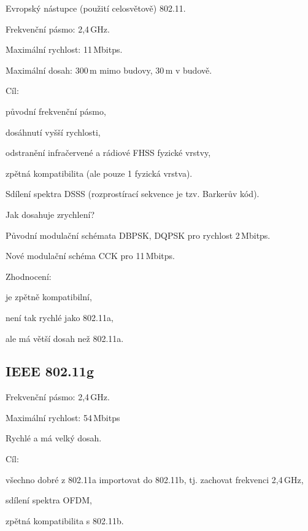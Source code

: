 \begin{compactitem}
    \item Evropský nástupce (použití celosvětově) 802.11.

    \item Frekvenční pásmo: 2,4\,GHz.
    \item Maximální rychlost: 11\,Mbitps.
    \item Maximální dosah: 300\,m mimo budovy, 30\,m v budově.

    \item Cíl: \begin{compactitem}
        \item původní frekvenční pásmo,
        \item dosáhnutí vyšší rychlosti,
        \item odstranění infračervené a rádiové FHSS fyzické vrstvy,
        \item zpětná kompatibilita (ale pouze 1 fyzická vrstva).
    \end{compactitem}

    \item Sdílení spektra DSSS (rozprostírací sekvence je tzv. Barkerův kód).

    \item Jak dosahuje zrychlení? \begin{compactitem}
        \item Původní modulační schémata DBPSK, DQPSK pro rychlost 2\,Mbitps.
        \item Nové modulační schéma CCK pro 11\,Mbitps.
    \end{compactitem}

    \item Zhodnocení: \begin{compactitem}
        \item je zpětně kompatibilní,
        \item není tak rychlé jako 802.11a,
        \item ale má větší dosah než 802.11a.
    \end{compactitem}
\end{compactitem}

\subsection{IEEE 802.11g}

\begin{compactitem}
    \item Frekvenční pásmo: 2,4\,GHz.
    \item Maximální rychlost: 54\,Mbitps
    \item Rychlé a má velký dosah.

    \item Cíl: \begin{compactitem}
        \item všechno dobré z 802.11a importovat do 802.11b, tj. zachovat frekvenci 2,4\,GHz,
        \item sdílení spektra OFDM,
        \item zpětná kompatibilita s 802.11b.
    \end{compactitem}
\end{compactitem}

